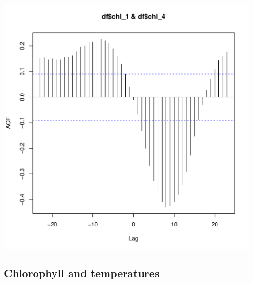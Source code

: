 \documentclass{article}\usepackage[]{graphicx}\usepackage[]{color}
\makeatletter
\def\maxwidth{ %
  \ifdim\Gin@nat@width>\linewidth
    \linewidth
  \else
    \Gin@nat@width
  \fi
}
\newenvironment{knitrout}{}{} %
\makeatother
\begin{document}
\begin{knitrout}
\includegraphics[width=\maxwidth]{figure/unnamed-chunk-6-2} 

\end{knitrout}

\subsection{Chlorophyll and temperatures}
\end{document}
